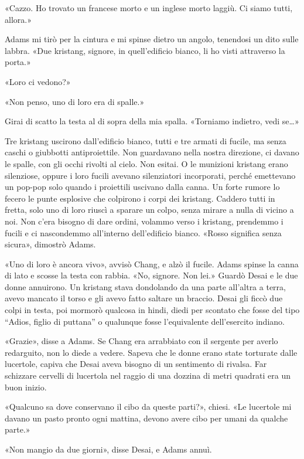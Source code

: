 «Cazzo. Ho trovato un francese morto e un inglese morto laggiù. Ci siamo
tutti, allora.»

Adams mi tirò per la cintura e mi spinse dietro un angolo, tenendosi un
dito sulle labbra. «Due kristang, signore, in quell'edificio bianco, li
ho visti attraverso la porta.»

«Loro ci vedono?»

«Non penso, uno di loro era di spalle.»

Girai di scatto la testa al di sopra della mia spalla. «Torniamo
indietro, vedi se\ldots»

Tre kristang uscirono dall'edificio bianco, tutti e tre armati di
fucile, ma senza caschi o giubbotti antiproiettile. Non guardavano nella
nostra direzione, ci davano le spalle, con gli occhi rivolti al cielo.
Non esitai. O le munizioni kristang erano silenziose, oppure i loro
fucili avevano silenziatori incorporati, perché emettevano un pop-pop
solo quando i proiettili uscivano dalla canna. Un forte rumore lo fecero
le punte esplosive che colpirono i corpi dei kristang. Caddero tutti in
fretta, solo uno di loro riuscì a sparare un colpo, senza mirare a nulla
di vicino a noi. Non c'era bisogno di dare ordini, volammo verso i
kristang, prendemmo i fucili e ci nascondemmo all'interno dell'edificio
bianco. «Rosso significa senza sicura», dimostrò Adams.

«Uno di loro è ancora vivo», avvisò Chang, e alzò il fucile. Adams
spinse la canna di lato e scosse la testa con rabbia. «No, signore. Non
lei.» Guardò Desai e le due donne annuirono. Un kristang stava
dondolando da una parte all'altra a terra, avevo mancato il torso e gli
avevo fatto saltare un braccio. Desai gli ficcò due colpi in testa, poi
mormorò qualcosa in hindi, diedi per scontato che fosse del tipo
``Adios, figlio di puttana'' o qualunque fosse l'equivalente
dell'esercito indiano.

«Grazie», disse a Adams. Se Chang era arrabbiato con il sergente per
averlo redarguito, non lo diede a vedere. Sapeva che le donne erano
state torturate dalle lucertole, capiva che Desai aveva bisogno di un
sentimento di rivalsa. Far schizzare cervelli di lucertola nel raggio di
una dozzina di metri quadrati era un buon inizio.

«Qualcuno sa dove conservano il cibo da queste parti?», chiesi. «Le
lucertole mi davano un pasto pronto ogni mattina, devono avere cibo per
umani da qualche parte.»

«Non mangio da due giorni», disse Desai, e Adams annuì.

